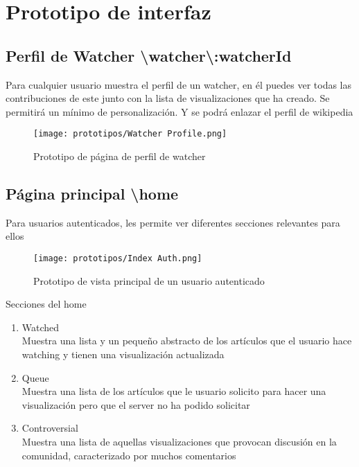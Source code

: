 \section{Prototipo de interfaz}

\subsection{Perfil de Watcher \textbackslash watcher\textbackslash:watcherId}
Para cualquier usuario muestra el perfil de un watcher, en él puedes ver todas las contribuciones de este junto con la lista de visualizaciones que ha creado.
Se permitirá un mínimo de personalización. Y se podrá enlazar el perfil de wikipedia

\begin{figure}[]
    \centering
    \texttt{[image: prototipos/Watcher Profile.png]}
    \caption{Prototipo de página de perfil de watcher}
    \label{PrototipoWatchersProfile}
\end{figure}

\subsection{Página principal \textbackslash home}
Para usuarios autenticados, les permite ver diferentes secciones relevantes para ellos

\begin{figure}[]
    \centering
    \texttt{[image: prototipos/Index Auth.png]}
    \caption{Prototipo de vista principal de un usuario autenticado}
    \label{PrototipoHomePage}
\end{figure}


Secciones del home
\begin{enumerate}
    \item Watched \\ Muestra una lista y un pequeño abstracto de los artículos que el usuario hace watching y tienen una visualización actualizada
    \item Queue \\ Muestra una lista de los artículos que le usuario solicito para hacer una visualización pero que el server no ha podido solicitar
    \item Controversial \\ Muestra una lista de aquellas visualizaciones que provocan discusión en la comunidad, caracterizado por muchos comentarios
\end{enumerate}

